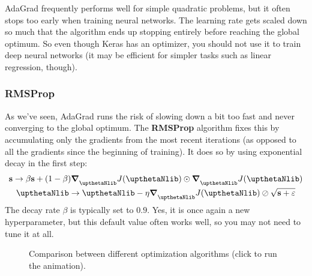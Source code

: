 AdaGrad frequently performs well for simple quadratic problems, but it often stops too early when training neural networks. The learning rate gets scaled down so much that the algorithm ends up stopping entirely before reaching the global optimum. So even though Keras has an  optimizer, you should not use it to train deep neural networks (it may be efficient for simpler tasks such as linear regression, though).
\subsubsection{RMSProp}
As we've seen, AdaGrad runs the risk of slowing down a bit too fast and never converging to the global optimum. The \textbf{RMSProp} algorithm fixes this by accumulating only the gradients from the most recent iterations (as opposed to all the gradients since the beginning of training). It does so by using exponential decay in the first step:
\begin{gather}
\mathbf{s}\rightarrow\beta\mathbf{s}+(1-\beta)\boldsymbol{\nabla}_{\boldtheta}J(\boldtheta)\odot\boldsymbol{\nabla}_{\boldtheta}J(\boldtheta)\\
\boldtheta\rightarrow\boldtheta-\eta\boldsymbol{\nabla}_{\boldtheta}J(\boldtheta)\oslash\sqrt{\mathbf{s}+\varepsilon}
\end{gather}
The decay rate $\beta$ is typically set to $0.9$. Yes, it is once again a new hyperparameter, but this default value often works well, so you may not need to tune it at all.
\begin{figure}[h!t]
\centering
{}
\caption{Comparison between different optimization algorithms (click to run the animation).}
\end{figure}

